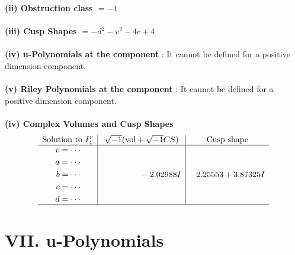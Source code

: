 \documentclass[1p]{elsarticle_modified}
\theoremstyle{definition}
\newcommand{\I}{\sqrt{-1}}
\begin{document}
\flushleft \textbf{(ii) Obstruction class $= -1$}\\~\\
\flushleft \textbf{(iii) Cusp Shapes $= - d^2- v^2-4 c+4$}\\~\\
\flushleft \textbf{(iv) u-Polynomials at the component} : It cannot be defined for a positive dimension component.\\~\\
\flushleft \textbf{(v) Riley Polynomials at the component} : It cannot be defined for a positive dimension component.\\~\\
\newpage\flushleft \textbf{(iv) Complex Volumes and Cusp Shapes}
$$\begin{array}{c|c|c} 
\text{Solution to }I^v_{4}& \I (\text{vol} + \sqrt{-1}CS) & \text{Cusp shape}\\
 \hline 
\begin{aligned}
v &= \cdots \\
a &= \cdots \\
b &= \cdots \\
c &= \cdots \\
d &= \cdots\end{aligned}
 & \phantom{-0.000000 } -2.02988 I & \phantom{-}2.25553 + 3.87325 I\\
 \hline 
 \end{array}
$$
\newpage\renewcommand{\arraystretch}{1}
\centering \section*{ VII. u-Polynomials}
\end{document}
